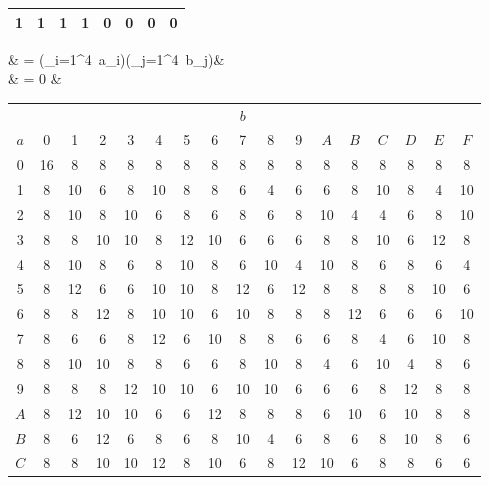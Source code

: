 \documentclass{article}
\begin{document}
\begin{description}[leftmargin=3pt]
\begin{framed}
\begin{description}
\begin{center}
\begin{tabular}{|c|c|c|c||c|c|c|c|}
					\hline 1 & 1 & 1 & 1 & 0 & 0 & 0 & 0 \\
					\hline
				\end{tabular}
			\end{center}
			\pagebreak
			\begin{flalign*}
				&
				 = (\oplus_{i=1}^4\ a_i)\oplus(\oplus_{j=1}^4\ b_j)&\\
				&   = 0 &
			\end{flalign*}
			\begin{center}
				\begin{tabular}{|c||c|c|c|c|c|c|c|c|c|c|c|c|c|c|c|c|}
					\hline & \multicolumn{15}{c}{$b$}&\\
					$a$ & 0 & 1 & 2 & 3 & 4 & 5 & 6 & 7 & 8 & 9 & $A$ & $B$ & $C$ & $D$ & $E$ & $F$ \\ \hline
					\hline 0 & 16 & 8 & 8 & 8 & 8 & 8 & 8 & 8 & 8 & 8 & 8 & 8 & 8 & 8 & 8 & 8\\
					\hline 1   & 8 & 10 & 6 & 8 & 10 & 8 & 8 & 6 & 4 & 6 & 6 & 8 & 10 & 8 & 4 & 10\\
					\hline 2   & 8 & 10 & 8 & 10 & 6 & 8 & 6 & 8 & 6 & 8 & 10 & 4 & 4 & 6 & 8 & 10\\
					\hline 3   & 8 & 8 & 10 & 10 & 8 & 12 & 10 & 6 & 6 & 6 & 8 & 8 & 10 & 6 & 12 & 8\\
					\hline 4   & 8 & 10 & 8 & 6 & 8 & 10 & 8 & 6 & 10 & 4 & 10 & 8 & 6 & 8 & 6 & 4\\
					\hline 5   & 8 & 12 & 6 & 6 & 10 & 10 & 8 & 12 & 6 & 12 & 8 & 8 & 8 & 8 & 10 & 6\\
					\hline 6   & 8 & 8 & 12 & 8 & 10 & 10 & 6 & 10 & 8 & 8 & 8 & 12 & 6 & 6 & 6 & 10\\
					\hline 7   & 8 & 6 & 6 & 8 & 12 & 6 & 10 & 8 & 8 & 6 & 6 & 8 & 4 & 6 & 10 & 8\\
					\hline 8   & 8 & 10 & 10 & 8 & 8 & 6 & 6 & 8 & 10 & 8 & 4 & 6 & 10 & 4 & 8 & 6\\
					\hline 9   & 8 & 8 & 8 & 12 & 10 & 10 & 6 & 10 & 10 & 6 & 6 & 6 & 8 & 12 & 8 & 8\\
					\hline $A$ & 8 & 12 & 10 & 10 & 6 & 6 & 12 & 8 & 8 & 8 & 6 & 10 & 6 & 10 & 8 & 8\\
					\hline $B$ & 8 & 6 & 12 & 6 & 8 & 6 & 8 & 10 & 4 & 6 & 8 & 6 & 8 & 10 & 8 & 6\\
					\hline $C$ & 8 & 8 & 10 & 10 & 12 & 8 & 10 & 6 & 8 & 12 & 10 & 6 & 8 & 8 & 6 & 6\\

\end{tabular}
\end{center}
\end{description}
\end{framed}
\end{description}
\end{document}
